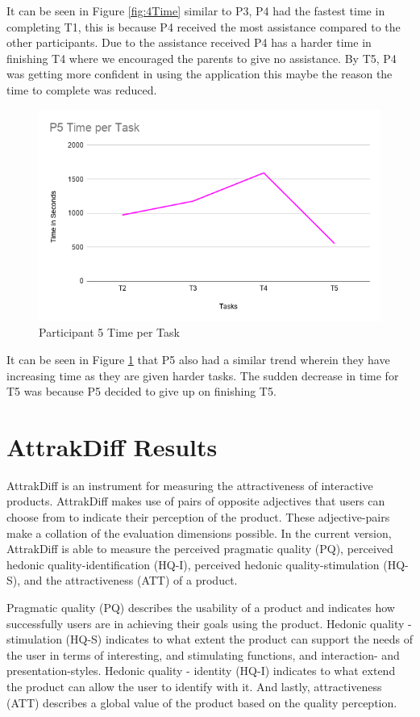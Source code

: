 It can be seen in Figure \ref{fig:4Time} similar to P3, P4 had the fastest time in completing T1, this is because P4 received the most assistance compared to the other participants. Due to the assistance received P4 has a harder time in finishing T4 where we encouraged the parents to give no assistance. By T5, P4 was getting more confident in using the application this maybe the reason the time to complete was reduced.

\begin{figure}[H]
    \centering
    \includegraphics[width=15cm]{figures/Results/P5Time.png}
    \caption{Participant 5 Time per Task}
    \label{fig:P5Time}
\end{figure}

It can be seen in Figure \ref{fig:P5Time} that P5 also had a similar trend wherein they have increasing time as they are given harder tasks. The sudden decrease in time for T5 was because P5 decided to give up on finishing T5.

\section{AttrakDiff Results}
AttrakDiff is an instrument for measuring the attractiveness of interactive products. AttrakDiff makes use of pairs of opposite adjectives that users can choose from to indicate their perception of the product. These adjective-pairs make a collation of the evaluation dimensions possible. In the current version, AttrakDiff is able to measure the perceived pragmatic quality (PQ), perceived hedonic quality-identification (HQ-I), perceived hedonic quality-stimulation (HQ-S), and the attractiveness (ATT) of a product.

Pragmatic quality (PQ) describes the usability of a product and indicates  how successfully users are in achieving their goals using the product. Hedonic quality - stimulation (HQ-S) indicates to what extent the product can support the needs of the user in terms of interesting, and stimulating functions, and interaction- and presentation-styles. Hedonic quality - identity (HQ-I) indicates to what extend the product can allow the user to identify with it. And lastly, attractiveness (ATT) describes a global value of the product based on the quality perception.


